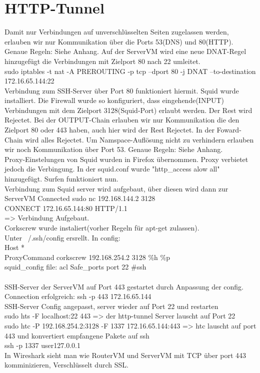 \documentclass[12pt]{article}
\theoremstyle{plain}
\begin{document}
\section{HTTP-Tunnel}
Damit nur Verbindungen auf unverschlüsselten Seiten zugelassen werden, erlauben wir nur Kommunikation über die Ports 53(DNS) und 80(HTTP). \\ Genaue Regeln: Siehe Anhang.
Auf der ServerVM wird eine neue DNAT-Regel hinzugefügt die Verbindungen mit Zielport 80 nach 22 umleitet.\\
sudo iptables -t nat -A PREROUTING -p tcp --dport 80 -j DNAT --to-destination 172.16.65.144:22\\
Verbindung zum SSH-Server über Port 80 funktioniert hiermit.
Squid wurde installiert.
Die Firewall wurde so konfiguriert, dass eingehende(INPUT) Verbindungen mit dem Zielport 3128(Squid-Port) erlaubt werden. Der Rest wird Rejectet. Bei der OUTPUT-Chain erlauben wir nur Kommunikation die den Zielport 80 oder 443 haben, auch hier wird der Rest Rejectet. In der Foward-Chain wird alles Rejectet. Um Namspace-Auflösung nicht zu verhindern erlauben wir noch Kommunikation über Port 53. Genaue Regeln: Siehe Anhang.\\
Proxy-Einstelungen von Squid wurden in Firefox übernommen. Proxy verbietet jedoch die Verbingung. In der squid.conf wurde "http\_access alow all" hinzugefügt. Surfen funktioniert nun.\\
Verbindung zum Squid server wird aufgebaut, über diesen wird dann zur ServerVM Connected
sudo nc 192.168.144.2 3128\\
CONNECT 172.16.65.144:80 HTTP/1.1\\
=> Verbindung Aufgebaut.\\
Corkscrew wurde instaliert(vorher Regeln für apt-get zulassen).\\
Unter ~/.ssh/config ersrellt. In config:\\
Host *\\
ProxyCommand corkscrew 192.168.254.2 3128 \%h \%p\\
squid\_config file: acl Safe\_ports port 22 \#ssh\\\\
SSH-Server der ServerVM auf Port 443 gestartet durch Anpassung der config.
Connection erfolgreich: ssh -p 443 172.16.65.144\\
SSH-Server Config angepasst, server wieder auf Port 22 und restarten\\
sudo hts -F localhost:22 443 => der http-tunnel Server lauscht auf Port 22\\
sudo htc -P 192.168.254.2:3128 -F 1337 172.16.65.144:443 => htc lauscht auf port 443 und konvertiert empfangene Pakete auf ssh\\
ssh -p 1337 user\@127.0.0.1\\
In Wireshark sieht man wie RouterVM und ServerVM mit TCP über port 443 komminizieren, Verschlüsselt durch SSL.\\
\end{document}
